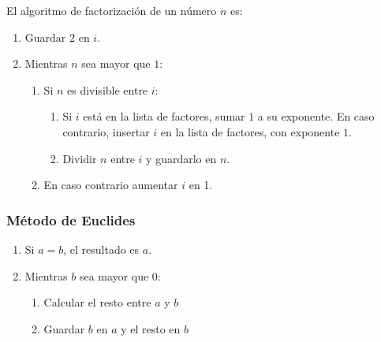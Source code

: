 El algoritmo de factorización de un número $n$ es:
\begin{enumerate}
    \item Guardar $2$ en $i$.
    \item Mientras $n$ sea mayor que $1$:
    \begin{enumerate}
        \item Si $n$ es divisible entre $i$:
        \begin{enumerate}
            \item Si $i$ está en la lista de factores, sumar $1$ a su exponente. En caso contrario, insertar $i$ en la lista de factores, con exponente $1$.
            \item Dividir $n$ entre $i$ y guardarlo en $n$.
        \end{enumerate}
        \item En caso contrario aumentar $i$ en 1.
    \end{enumerate}
\end{enumerate}


\subsubsection{Método de Euclides}


\begin{enumerate}
    \item Si $a=b$, el resultado es $a$.
    \item Mientras $b$ sea mayor que $0$:
    \begin{enumerate}
        \item Calcular el resto entre $a$ y $b$
        \item Guardar $b$ en $a$ y el resto en $b$
    \end{enumerate}
\end{enumerate}

